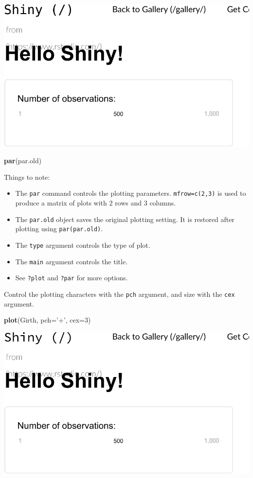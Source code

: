 \documentclass[]{book}
\newenvironment{Shaded}{\begin{snugshade}}{\end{snugshade}}
\newcommand{\KeywordTok}[1]{\textcolor[rgb]{0.13,0.29,0.53}{\textbf{#1}}}
\newcommand{\DataTypeTok}[1]{\textcolor[rgb]{0.13,0.29,0.53}{#1}}
\newcommand{\DecValTok}[1]{\textcolor[rgb]{0.00,0.00,0.81}{#1}}
\newcommand{\StringTok}[1]{\textcolor[rgb]{0.31,0.60,0.02}{#1}}
\newcommand{\NormalTok}[1]{#1}
\providecommand{\tightlist}{%
  \setlength{\itemsep}{0pt}\setlength{\parskip}{0pt}}
\theoremstyle{definition}
\theoremstyle{definition}
\theoremstyle{definition}
\theoremstyle{remark}
\begin{document}
\includegraphics[width=0.5\linewidth]{Rcourse_files/figure-latex/unnamed-chunk-263-1}

\begin{Shaded}
\begin{Highlighting}[]
\KeywordTok{par}\NormalTok{(par.old)}
\end{Highlighting}
\end{Shaded}

Things to note:

\begin{itemize}
\tightlist
\item
  The \texttt{par} command controls the plotting parameters.
  \texttt{mfrow=c(2,3)} is used to produce a matrix of plots with 2 rows
  and 3 columns.
\item
  The \texttt{par.old} object saves the original plotting setting. It is
  restored after plotting using \texttt{par(par.old)}.
\item
  The \texttt{type} argument controls the type of plot.
\item
  The \texttt{main} argument controls the title.
\item
  See \texttt{?plot} and \texttt{?par} for more options.
\end{itemize}

Control the plotting characters with the \texttt{pch} argument, and size
with the \texttt{cex} argument.

\begin{Shaded}
\begin{Highlighting}[]
\KeywordTok{plot}\NormalTok{(Girth, }\DataTypeTok{pch=}\StringTok{'+'}\NormalTok{, }\DataTypeTok{cex=}\DecValTok{3}\NormalTok{)}
\end{Highlighting}
\end{Shaded}

\includegraphics[width=0.5\linewidth]{Rcourse_files/figure-latex/unnamed-chunk-264-1}
\end{document}
